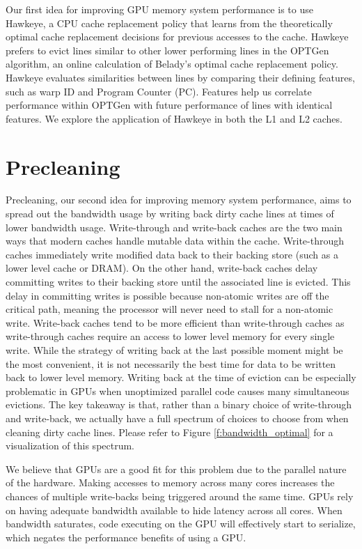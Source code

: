 Our first idea for improving GPU memory system performance is to use Hawkeye, a CPU cache replacement policy that learns from the theoretically optimal cache replacement decisions for previous accesses to the cache. Hawkeye prefers to evict lines similar to other lower performing lines in the OPTGen algorithm, an online calculation of Belady’s optimal cache replacement policy. Hawkeye evaluates similarities between lines by comparing their defining features, such as warp ID and Program Counter (PC). Features help us correlate performance within OPTGen with future performance of lines with identical features. We explore the application of Hawkeye in both the L1 and L2 caches.

\section{Precleaning}
Precleaning, our second idea for improving memory system performance, aims to spread out the bandwidth usage by writing back dirty cache lines at times of lower bandwidth usage. Write-through and write-back caches are the two main ways that modern caches handle mutable data within the cache. Write-through caches immediately write modified data back to their backing store (such as a lower level cache or DRAM). On the other hand, write-back caches delay committing writes to their backing store until the associated line is evicted. This delay in committing writes is possible because non-atomic writes are off the critical path, meaning the processor will never need to stall for a non-atomic write. Write-back caches tend to be more efficient than write-through caches as write-through caches require an access to lower level memory for every single write. While the strategy of writing back at the last possible moment might be the most convenient, it is not necessarily the best time for data to be written back to lower level memory. Writing back at the time of eviction can be especially problematic in GPUs when unoptimized parallel code causes many simultaneous evictions. The key takeaway is that, rather than a binary choice of write-through and write-back, we actually have a full spectrum of choices to choose from when cleaning dirty cache lines. Please refer to Figure \ref{f:bandwidth_optimal} for a visualization of this spectrum.

We believe that GPUs are a good fit for this problem due to the parallel nature of the hardware. Making accesses to memory across many cores increases the chances of multiple write-backs being triggered around the same time. GPUs rely on having adequate bandwidth available to hide latency across all cores. When bandwidth saturates, code executing on the GPU will effectively start to serialize, which negates the performance benefits of using a GPU. 

